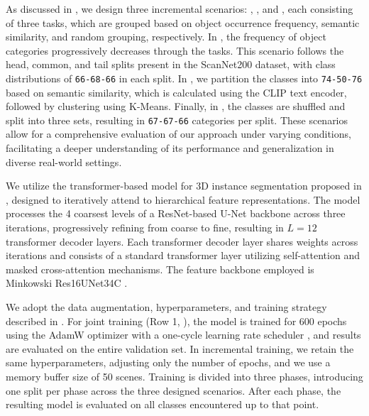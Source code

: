 As discussed in , we design three incremental scenarios: \fsplit, \ssplit, and \rsplit, each consisting of three tasks, which are grouped based on object occurrence frequency, semantic similarity, and random grouping, respectively. In \fsplit, the frequency of object categories progressively decreases through the tasks. This scenario follows the head, common, and tail splits present in the ScanNet200 dataset, with class distributions of \texttt{66-68-66} in each split. In \ssplit, we partition the classes into \texttt{74-50-76} based on semantic similarity, which is calculated using the CLIP \cite{radford2021learning} text encoder, followed by clustering using K-Means. Finally, in \rsplit, the classes are shuffled and split into three sets, resulting in \texttt{67-67-66} categories per split. These scenarios allow for a comprehensive evaluation of our approach under varying conditions, facilitating a deeper understanding of its performance and generalization in diverse real-world settings.

 We utilize the transformer-based model for 3D instance segmentation proposed in \cite{Schult23ICRA}, designed to iteratively attend to hierarchical feature representations. The model processes the 4 coarsest levels of a ResNet-based U-Net backbone across three iterations, progressively refining from coarse to fine, resulting in $L=12$ transformer decoder layers. Each transformer decoder layer shares weights across iterations and consists of a standard transformer layer utilizing self-attention and masked cross-attention mechanisms. The feature backbone employed is Minkowski Res16UNet34C \cite{choy20194d}.

 We adopt the data augmentation, hyperparameters, and training strategy described in \cite{Schult23ICRA}. For joint training (Row 1, ), the model is trained for 600 epochs using the AdamW optimizer \cite{loshchilov2017decoupled} with a one-cycle learning rate scheduler \cite{smith2018superconvergence}, and results are evaluated on the entire validation set. In incremental training, we retain the same hyperparameters, adjusting only the number of epochs, and we use a memory buffer size of 50 scenes. Training is divided into three phases, introducing one split per phase across the three designed scenarios. After each phase, the resulting model is evaluated on all classes encountered up to that point.%

